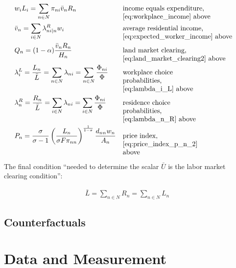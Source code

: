 \documentclass[10pt]{article}
\begin{document}
\begin{align}
    &w_i L_i=\sum_{n \in N} \pi_{n i} \bar{v}_n R_n && \parbox[t]{6cm}{\raggedright income equals expenditure, \eqref{eq:workplace_income} above} \\
    &\bar{v}_n=\sum_{i \in N} \lambda_{n i \mid n}^R w_i && \parbox[t]{6cm}{\raggedright average residential income, \eqref{eq:expected_worker_income} above} \\
    &Q_n=(1-\alpha) \frac{\bar{v}_n R_n}{H_n} && \parbox[t]{6cm}{\raggedright land market clearing, \eqref{eq:land_market_clearing2} above} \\
    &\lambda_i^L=\frac{L_n}{\bar{L}}=\sum_{n \in N} \lambda_{n i}=\sum_{n \in N} \frac{\Phi_{n i}}{\Phi} && \parbox[t]{4cm}{\raggedright workplace choice probabilities, \eqref{eq:lambda_i_L} above} \\
    &\lambda_n^R=\frac{R_n}{\bar{L}}=\sum_{i \in N} \lambda_{n i}=\sum_{i \in N} \frac{\Phi_{n i}}{\Phi} && \parbox[t]{4cm}{\raggedright residence choice probabilities, \eqref{eq:lambda_n_R} above} \\
    &P_n =\frac{\sigma}{\sigma-1}\left(\frac{L_n}{\sigma F \pi_{n n}}\right)^{\frac{1}{1-\sigma}} \frac{d_{n n} w_n}{A_n} && \parbox[t]{4cm}{\raggedright price index, \eqref{eq:price_index_p_n_2} above} \\
\end{align}

The final condition 
``needed to determine the scalar $\bar{U}$ is the labor
market clearing condition'':

\begin{align}
    \bar{L}=\sum_{n \in N} R_n=\sum_{n \in N} L_n
\end{align}


\subsection{Counterfactuals}


\section{Data and Measurement}
\end{document}
